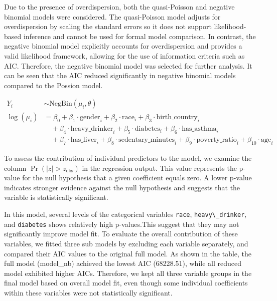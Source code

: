 \documentclass[
  11pt,
]{article}
\newcommand{\passthrough}[1]{#1}
\begin{document}
Due to the presence of overdispersion, both the quasi-Poisson and negative binomial models were considered. The quasi-Poisson model adjusts for overdispersion by scaling the standard errors so it does not support likelihood-based inference and cannot be used for formal model comparison. In contrast, the negative binomial model explicitly accounts for overdispersion and provides a valid likelihood framework, allowing for the use of information criteria such as AIC. Therefore, the negative binomial model was selected for further analysis. It can be seen that the AIC reduced significantly in negative binomial models compared to the Possion model.

\begin{align*}
Y_i &\sim \text{NegBin}(\mu_i, \theta) \\
\log(\mu_i) &= \beta_0 + \beta_1 \cdot \text{gender}_i + \beta_2 \cdot \text{race}_i + \beta_3 \cdot \text{birth\_country}_i \\
&\quad + \beta_4 \cdot \text{heavy\_drinker}_i + \beta_5 \cdot \text{diabetes}_i + \beta_6 \cdot \text{has\_asthma}_i \\
&\quad + \beta_7 \cdot \text{has\_liver}_i + \beta_8 \cdot \text{sedentary\_minutes}_i + \beta_9 \cdot \text{poverty\_ratio}_i+ \beta_10 \cdot \text{age}_i
\end{align*}

\begin{table}[!h]
\centering
\caption{\label{tab:NegBin}AIC Comparison between Poisson and Negative Binomial Models}
\centering
{}
\end{table}

To assess the contribution of individual predictors to the model, we examine the column \(\Pr\left(|z| > z_{\text{obs}}\right)\) in the regression output. This value represents the p-value for the null hypothesis that a given coefficient equals zero. A lower p-value indicates stronger evidence against the null hypothesis and suggests that the variable is statistically significant.

In this model, several levels of the categorical variables \passthrough{\lstinline!race!}, \passthrough{\lstinline!heavy\_drinker!}, and \passthrough{\lstinline!diabetes!} shows relatively high p-values.This suggest that they may not significantly improve model fit. To evaluate the overall contribution of these variables, we fitted three sub models by excluding each variable separately, and compared their AIC values to the original full model. As shown in the table, the full model (model\_nb) achieved the lowest AIC (68228.51), while all reduced model exhibited higher AICs. Therefore, we kept all three variable groups in the final model based on overall model fit, even though some individual coefficients within these variables were not statistically significant.
\end{document}
